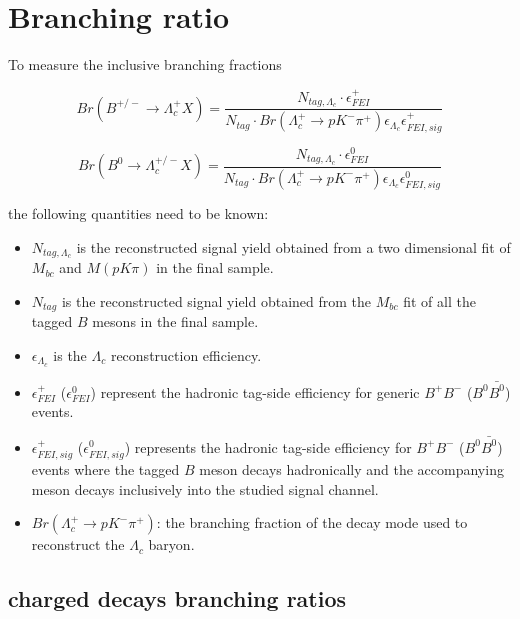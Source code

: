 \chapter{Branching ratio}
To measure the inclusive branching fractions

\begin{equation}
    Br(B^{+/-} \rightarrow \Lambda_c^{+} X) = \frac{ N_{tag, \Lambda_c} \cdot  \epsilon^{+}_{FEI}}{N_{tag} \cdot Br(\Lambda_c^+ \rightarrow  p K^- \pi^+) \epsilon_{\Lambda_c} \epsilon^{+}_{FEI,  sig }}
\end{equation}\label{eq:chargedB_BRformula}

\begin{equation}
    Br(B^{0} \rightarrow \Lambda_c^{+/-} X) = \frac{ N_{tag, \Lambda_c} \cdot  \epsilon^{0}_{FEI}}{N_{tag} \cdot Br(\Lambda_c^+ \rightarrow  p K^- \pi^+) \epsilon_{\Lambda_c} \epsilon^{0}_{FEI,  sig }}
\end{equation}\label{eq:B0_BRformula}

the following quantities need to be known: 
\begin{itemize}

\item $N_{tag, \Lambda_c} $ is the reconstructed signal yield obtained from a two dimensional fit of $M_{bc}$ and $M(p K \pi)$ in the final sample.
\item ${N_{tag}}$ is the reconstructed signal yield obtained from the $M_{bc}$ fit of all the tagged $B$ mesons in the final sample.
\item $\epsilon_{\Lambda_c} $ is the $\Lambda_c$ reconstruction efficiency.
\item $\epsilon^{+}_{FEI}$ ($\epsilon^{0}_{FEI}$) represent the hadronic tag-side efficiency for generic $B^+B^- $ ($B^0\bar{B^0}$) events. 
\item $\epsilon^{+}_{FEI,  sig}$ ($\epsilon^{0}_{FEI,  sig }$) represents the hadronic tag-side efficiency for  $B^+B^-$ ($B^0\bar{B^0}$) events where the tagged $B$ meson decays hadronically and the accompanying meson decays inclusively into the studied signal channel. 
\item  $Br(\Lambda_c^+ \rightarrow  p K^- \pi^+) $: the branching fraction of the decay mode used to reconstruct the  $\Lambda_c$ baryon.
\end{itemize}
\vspace{0.2 cm}

\section{charged decays branching ratios}

